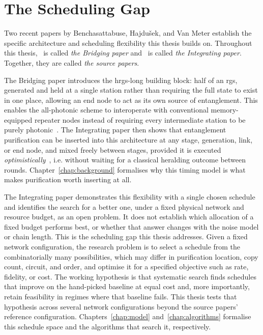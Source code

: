 \section{The Scheduling Gap}
\label{sec:intro:gap}

Two recent papers by Benchasattabuse, Hajdušek, and Van Meter establish the specific architecture and scheduling flexibility this thesis builds on. Throughout this thesis,~\cite{Benchasattabuse2026Bridging} is called \emph{the Bridging paper} and~\cite{Benchasattabuse2025Integrating} is called \emph{the Integrating paper}. Together, they are called \emph{the source papers}.

The Bridging paper introduces the \Gls{hrgs-long} building block: half of an \Gls{rgs}, generated and held at a single station rather than requiring the full state to exist in one place, allowing an end node to act as its own source of entanglement. This enables the all-photonic scheme to interoperate with conventional memory-equipped repeater nodes instead of requiring every intermediate station to be purely photonic~\cite{Benchasattabuse2026Bridging}. The Integrating paper then shows that entanglement purification can be inserted into this architecture at any stage, generation, link, or end node, and mixed freely between stages, provided it is executed \emph{optimistically}~\cite{Benchasattabuse2025Integrating,Mobayenjarihani2023Optimistic}, i.e. without waiting for a classical heralding outcome between rounds. Chapter~\ref{chap:background} formalises why this timing model is what makes purification worth inserting at all.

The Integrating paper demonstrates this flexibility with a single chosen schedule and identifies the search for a better one, under a fixed physical network and resource budget, as an open problem. It does not establish which allocation of a fixed budget performs best, or whether that answer changes with the noise model or chain length. This is the scheduling gap this thesis addresses. Given a fixed network configuration, the research problem is to select a schedule from the combinatorially many possibilities, which may differ in purification location, copy count, circuit, and order, and optimise it for a specified objective such as rate, fidelity, or cost. The working hypothesis is that systematic search finds schedules that improve on the hand-picked baseline at equal cost and, more importantly, retain feasibility in regimes where that baseline fails. This thesis tests that hypothesis across several network configurations beyond the source papers' reference configuration. Chapters~\ref{chap:model} and~\ref{chap:algorithms} formalise this schedule space and the algorithms that search it, respectively.

